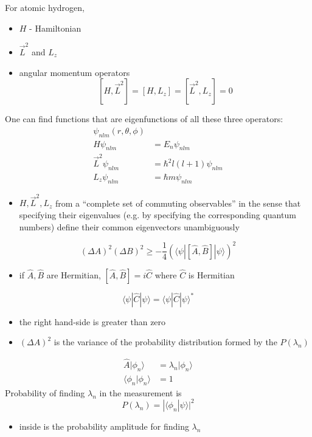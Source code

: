 \documentclass[a4paper,11pt,normalem]{article}
\begin{document}
\begin{example}
For atomic hydrogen, 
\begin{itemize}
    \item \(H\) - Hamiltonian 
    \item \(\vec{L}^2\) and \(L_z\)
    \item angular momentum operators
\[
    [H,\vec{L}^2] = [H,L_z] = [\vec{L}^2,L_z] = 0
\]
\end{itemize}
One can find functions that are eigenfunctions of all these three
operators:
\[
    \begin{aligned}
    \psi_{nlm}(r,\theta,\phi) \\
    H\psi_{nlm} &= E_n\psi_{nlm} \\
    \vec{L}^2\psi_{nlm} &= \hbar^2l(l+1)\psi_{nlm} \\
    L_z\psi_{nlm} &= \hbar m\psi_{nlm}
    \end{aligned}
\]
\begin{itemize}
\item
  \(H,\vec{L}^2,L_z\) from a ``complete set of commuting observables''
  in the sense that specifying their eigenvalues (e.g. by specifying the
  corresponding quantum numbers) define their common eigenvectors
  unambiguously
\end{itemize}
\[
    (\Delta A)^2(\Delta B)^2 \geq -\frac{1}{4}(\langle\psi|[\hat{A},\hat{B}]|\psi\rangle)^2
\]
\begin{itemize}
\item
  if \(\hat{A},\hat{B}\) are Hermitian, \([\hat{A},\hat{B}] = i\hat{C}\)
  where \(\hat{C}\) is Hermitian
\end{itemize}
\[
    \langle\psi|\hat{C}|\psi\rangle = \langle\psi|\hat{C}|\psi\rangle^{ * }
\]
\begin{itemize}
\item
  the right hand-side is greater than zero
\item
  \((\Delta A)^2\) is the variance of the probability distribution
  formed by the \(P(\lambda_n)\)
\end{itemize}
\[
    \begin{aligned}
    \hat{A}|\phi_n\rangle &= \lambda_n|\phi_n\rangle \\
    \langle\phi_n|\phi_n\rangle &= 1
    \end{aligned}
\]
Probability of finding \(\lambda_n\) in the measurement is
\[
    P(\lambda_n) = |\langle\phi_n|\psi\rangle|^2
\]
\begin{itemize}
\item
  inside is the probability amplitude for finding \(\lambda_n\)

\end{itemize}
\end{example}
\end{document}
